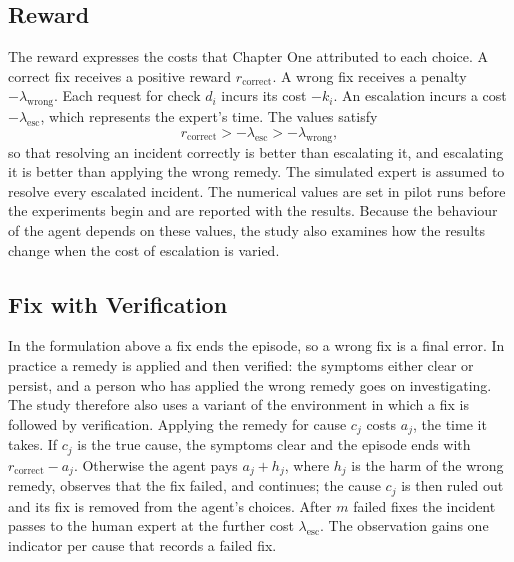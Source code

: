 \subsection{Reward}

The reward expresses the costs that Chapter One attributed to each choice. A correct fix receives a positive reward $r_{\text{correct}}$. A wrong fix receives a penalty $-\lambda_{\text{wrong}}$. Each request for check $d_i$ incurs its cost $-k_i$. An escalation incurs a cost $-\lambda_{\text{esc}}$, which represents the expert's time. The values satisfy
\begin{equation}
r_{\text{correct}} > -\lambda_{\text{esc}} > -\lambda_{\text{wrong}},
\label{eq:reward}
\end{equation}
so that resolving an incident correctly is better than escalating it, and escalating it is better than applying the wrong remedy. The simulated expert is assumed to resolve every escalated incident. The numerical values are set in pilot runs before the experiments begin and are reported with the results. Because the behaviour of the agent depends on these values, the study also examines how the results change when the cost of escalation is varied.

\subsection{Fix with Verification}

In the formulation above a fix ends the episode, so a wrong fix is a final error. In practice a remedy is applied and then verified: the symptoms either clear or persist, and a person who has applied the wrong remedy goes on investigating. The study therefore also uses a variant of the environment in which a fix is followed by verification. Applying the remedy for cause $c_j$ costs $a_j$, the time it takes. If $c_j$ is the true cause, the symptoms clear and the episode ends with $r_{\text{correct}} - a_j$. Otherwise the agent pays $a_j + h_j$, where $h_j$ is the harm of the wrong remedy, observes that the fix failed, and continues; the cause $c_j$ is then ruled out and its fix is removed from the agent's choices. After $m$ failed fixes the incident passes to the human expert at the further cost $\lambda_{\text{esc}}$. The observation gains one indicator per cause that records a failed fix.

